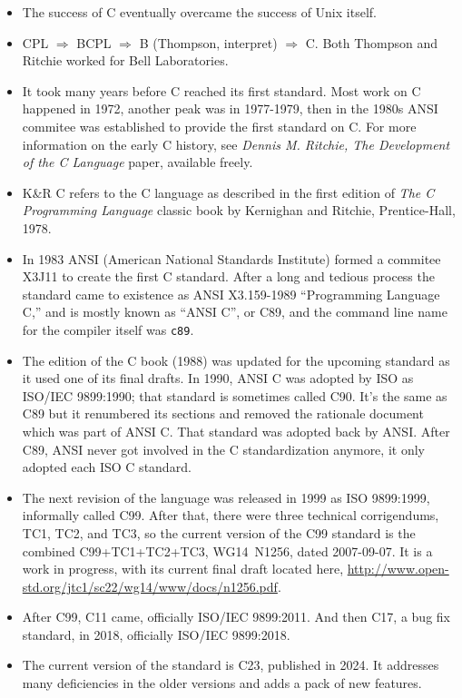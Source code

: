 \begin{itemize}
\item The success of C eventually overcame the success of Unix itself.
\item CPL $\Rightarrow$ BCPL $\Rightarrow$ B (Thompson, interpret)
$\Rightarrow$ C.  Both Thompson and Ritchie worked for Bell Laboratories.
\item It took many years before C reached its first standard.  Most work on C
happened in 1972, another peak was in 1977-1979, then in the 1980s ANSI commitee
was established to provide the first standard on C.  For more information on the
early C history, see \emph{Dennis M. Ritchie, The Development of the C Language}
paper, available freely.
\item K\&R C refers to the C language as described in the first edition of
\emph{The C Prog\-ramm\-ing Language} classic book by Kernighan and Ritchie,
Prentice-Hall, 1978.
\item In 1983 ANSI (American National Standards Institute) formed a commitee
X3J11 to create the first C standard.  After a long and tedious process the
standard came to existence as ANSI X3.159-1989 ``Programming Language C,'' and
is mostly known as ``ANSI C'', or C89, and the command line name for the
compiler itself was \texttt{c89}.
\item The  edition of the C book (1988) was updated for the upcoming
standard as it used one of its final drafts.  In 1990, ANSI C was adopted by ISO
as ISO/IEC 9899:1990; that standard is sometimes called C90.  It's the same as
C89 but it renumbered its sections and removed the rationale document which was
part of ANSI C.  That standard was adopted back by ANSI.  After C89, ANSI never
got involved in the C standardization anymore, it only adopted each ISO C
standard.
\item The next revision of the language was released in 1999 as ISO 9899:1999,
informally called C99.  After that, there were three technical corrigendums,
TC1, TC2, and TC3, so the current version of the C99 standard is the combined
C99+TC1+TC2+TC3, WG14~N1256, dated 2007-09-07.  It is a work in progress,
with its current final draft located here,
\url{http://www.open-std.org/jtc1/sc22/wg14/www/docs/n1256.pdf}.
\item After C99, C11 came, officially ISO/IEC 9899:2011. And then C17,
a bug fix standard, in 2018, officially ISO/IEC 9899:2018.
\item The current version of the standard is C23, published in 2024. It
addresses many deficiencies in the older versions and adds a pack of new features.

\end{itemize}
